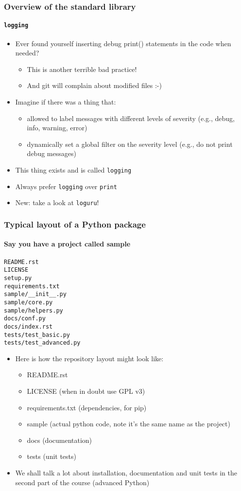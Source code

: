 \documentclass[9pt]{beamer}
\begin{document}
\begin{frame}
  \frametitle{Overview of the standard library}
  \framesubtitle{\texttt{logging}}
  \begin{itemize}
  \item Ever found yourself inserting debug print() statements in the code
    when needed?
    \begin{itemize}
    \item This is another terrible bad practice!
    \item And git will complain about modified files :-)
    \end{itemize}
  \item Imagine if there was a thing that:
    \begin{itemize}
    \item allowed to label messages with different levels of severity
      (e.g., debug, info, warning, error)
    \item dynamically set a global filter on the severity level
      (e.g., do not print debug messages)
    \end{itemize}
  \item This thing exists and is called \texttt{logging}
  \item \alert{Always prefer \texttt{logging} over \texttt{print}}
  \item \alert{New: take a look at \texttt{loguru}!}
  \end{itemize}
\end{frame}


\begin{frame}[fragile]
  \frametitle{Typical layout of a Python package}
  \framesubtitle{Say you have a project called sample}
  \begin{Verbatim}
README.rst
LICENSE
setup.py
requirements.txt
sample/__init__.py
sample/core.py
sample/helpers.py
docs/conf.py
docs/index.rst
tests/test_basic.py
tests/test_advanced.py
  \end{Verbatim}

  \medskip

  \begin{itemize}
  \item Here is how the repository layout might look like:
    \begin{itemize}
    \item README.rst
    \item LICENSE (when in doubt use GPL v3)
    \item requirements.txt (dependencies, for pip)
    \item sample (actual python code, note it's the same name as the project)
    \item docs (documentation)
    \item tests (unit tests)
    \end{itemize}
  \item We shall talk a lot about installation, documentation and unit tests
    in the second part of the course (advanced Python)
  \end{itemize}
\end{frame}
\end{document}
